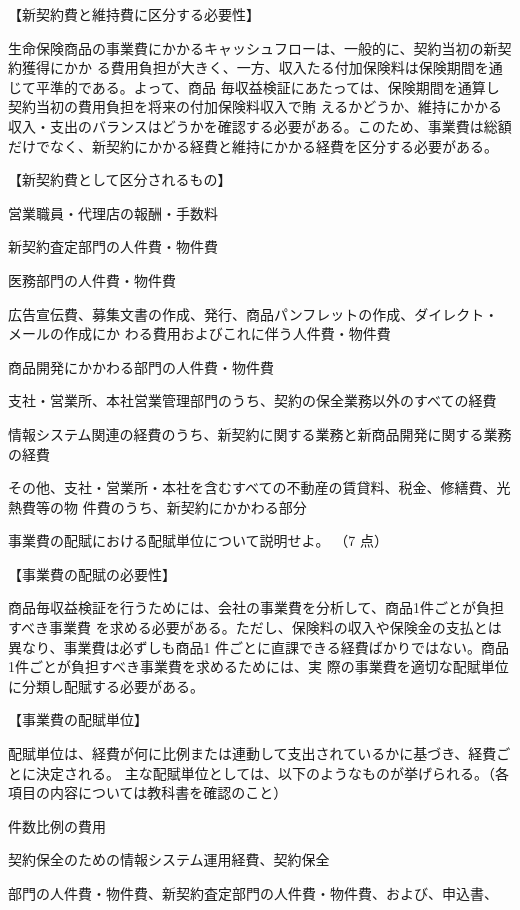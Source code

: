 \documentclass[report,gutter=10mm,fore-edge=10mm,uplatex,dvipdfmx]{jlreq}
\begin{document}
\answer{}
【新契約費と維持費に区分する必要性】

生命保険商品の事業費にかかるキャッシュフローは、一般的に、契約当初の新契約獲得にかか
る費用負担が大きく、一方、収入たる付加保険料は保険期間を通じて平準的である。よって、商品
毎収益検証にあたっては、保険期間を通算し契約当初の費用負担を将来の付加保険料収入で賄
えるかどうか、維持にかかる収入・支出のバランスはどうかを確認する必要がある。このため、事業費は総額だけでなく、新契約にかかる経費と維持にかかる経費を区分する必要がある。

【新契約費として区分されるもの】

営業職員・代理店の報酬・手数料

新契約査定部門の人件費・物件費

医務部門の人件費・物件費

広告宣伝費、募集文書の作成、発行、商品パンフレットの作成、ダイレクト・メールの作成にか
わる費用およびこれに伴う人件費・物件費

商品開発にかかわる部門の人件費・物件費

支社・営業所、本社営業管理部門のうち、契約の保全業務以外のすべての経費

情報システム関連の経費のうち、新契約に関する業務と新商品開発に関する業務の経費

その他、支社・営業所・本社を含むすべての不動産の賃貸料、税金、修繕費、光熱費等の物
件費のうち、新契約にかかわる部分

事業費の配賦における配賦単位について説明せよ。
（7 点）

\answer{}

【事業費の配賦の必要性】

商品毎収益検証を行うためには、会社の事業費を分析して、商品1件ごとが負担すべき事業費
を求める必要がある。ただし、保険料の収入や保険金の支払とは異なり、事業費は必ずしも商品1
件ごとに直課できる経費ばかりではない。商品1件ごとが負担すべき事業費を求めるためには、実
際の事業費を適切な配賦単位に分類し配賦する必要がある。

【事業費の配賦単位】

配賦単位は、経費が何に比例または連動して支出されているかに基づき、経費ごとに決定される。
主な配賦単位としては、以下のようなものが挙げられる。（各項目の内容については教科書を確認のこと）

件数比例の費用

契約保全のための情報システム運用経費、契約保全

部門の人件費・物件費、新契約査定部門の人件費・物件費、および、申込書、
\end{document}
